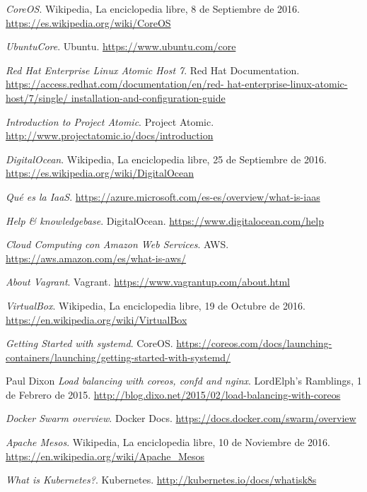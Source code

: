 \begin{thebibliography}{9}
\textit{CoreOS}. 
Wikipedia, La enciclopedia libre, 8 de Septiembre de 2016.
\url{https://es.wikipedia.org/wiki/CoreOS}

\textit{UbuntuCore}. 
Ubuntu.
\url{https://www.ubuntu.com/core}

\textit{Red Hat Enterprise Linux Atomic Host 7}. 
Red Hat Documentation.
\url{https://access.redhat.com/documentation/en/red-
hat-enterprise-linux-atomic-host/7/single/
installation-and-configuration-guide}

\textit{Introduction to Project Atomic}. 
Project Atomic.
\url{http://www.projectatomic.io/docs/introduction}

\textit{DigitalOcean}. 
Wikipedia, La enciclopedia libre, 25 de Septiembre de 2016.
\url{https://es.wikipedia.org/wiki/DigitalOcean}

\textit{Qué es la IaaS}.
\url{https://azure.microsoft.com/es-es/overview/what-is-iaas}

\textit{Help \& knowledgebase}. 
DigitalOcean.
\url{https://www.digitalocean.com/help}

\textit{Cloud Computing con Amazon Web Services}. 
AWS.
\url{https://aws.amazon.com/es/what-is-aws/}

\textit{About Vagrant}. 
Vagrant.
\url{https://www.vagrantup.com/about.html}

\textit{VirtualBox}. 
Wikipedia, La enciclopedia libre, 19 de Octubre de 2016.
\url{https://en.wikipedia.org/wiki/VirtualBox}

\textit{Getting Started with systemd}. 
CoreOS.
\url{https://coreos.com/docs/launching-containers/launching/getting-started-with-systemd/}

Paul Dixon
\textit{Load balancing with coreos, confd and nginx}. 
LordElph's Ramblings, 1 de Febrero de 2015.
\url{http://blog.dixo.net/2015/02/load-balancing-with-coreos}

\textit{Docker Swarm overview}. 
Docker Docs.
\url{https://docs.docker.com/swarm/overview}

\textit{Apache Mesos}. 
Wikipedia, La enciclopedia libre, 10 de Noviembre de 2016.
\url{https://en.wikipedia.org/wiki/Apache\_Mesos}

\textit{What is Kubernetes?}. 
Kubernetes.
\url{http://kubernetes.io/docs/whatisk8s}


\end{thebibliography}
